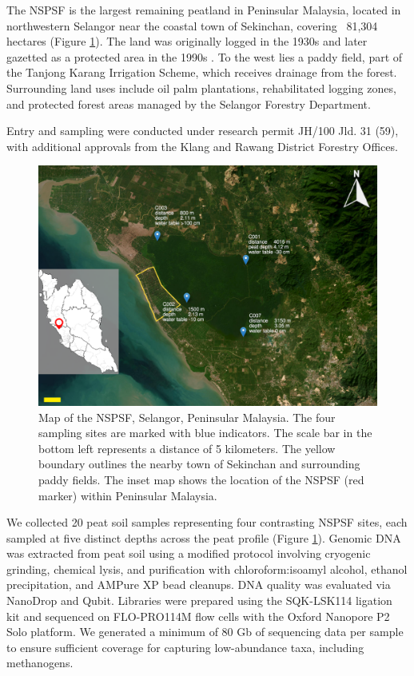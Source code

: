 
\footnotesize

The NSPSF is the largest remaining peatland in Peninsular Malaysia, located in northwestern Selangor near the coastal town of Sekinchan, covering ~81,304 hectares (Figure \ref{fig:map}). The land was originally logged in the 1930s and later gazetted as a protected area in the 1990s \cite{GEC_2014}. To the west lies a paddy field, part of the Tanjong Karang Irrigation Scheme, which receives drainage from the forest. Surrounding land uses include oil palm plantations, rehabilitated logging zones, and protected forest areas managed by the Selangor Forestry Department.

Entry and sampling were conducted under research permit JH/100 Jld. 31 (59), with additional approvals from the Klang and Rawang District Forestry Offices.

\begin{figure}[H]
    \vspace{-0.4cm}
    \centering
    \includegraphics[width=0.9\linewidth]{content-images/map_plot4.png}
    \caption{\scriptsize Map of the NSPSF, Selangor, Peninsular Malaysia. The four sampling sites are marked with blue indicators. The scale bar in the bottom left represents a distance of 5 kilometers. The yellow boundary outlines the nearby town of Sekinchan and surrounding paddy fields. The inset map shows the location of the NSPSF (red marker) within Peninsular Malaysia.}
    \label{fig:map}
\end{figure}

\vspace{-0.3cm}

We collected 20 peat soil samples representing four contrasting NSPSF sites, each sampled at five distinct depths across the peat profile (Figure \ref{fig:map}). Genomic DNA was extracted from peat soil using a modified protocol involving cryogenic grinding, chemical lysis, and purification with chloroform:isoamyl alcohol, ethanol precipitation, and AMPure XP bead cleanups. DNA quality was evaluated via NanoDrop and Qubit. Libraries were prepared using the SQK-LSK114 ligation kit and sequenced on FLO-PRO114M flow cells with the Oxford Nanopore P2 Solo platform. We generated a minimum of 80 Gb of sequencing data per sample to ensure sufficient coverage for capturing low-abundance taxa, including methanogens.

